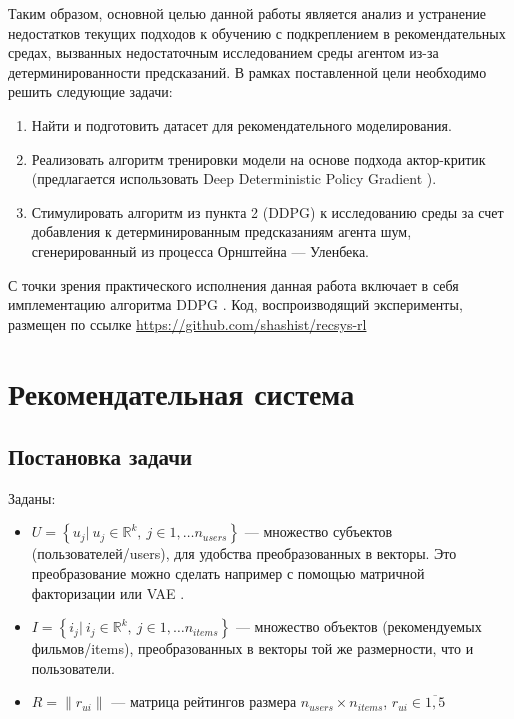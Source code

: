 \documentclass[14pt]{extarticle}
\begin{document}
Таким образом, основной целью данной работы является анализ и устранение недостатков текущих подходов к обучению с подкреплением в рекомендательных средах, вызванных недостаточным исследованием среды агентом из-за детерминированности предсказаний. В рамках поставленной цели необходимо решить следующие задачи:
\begin{enumerate}
\item Найти и подготовить датасет для рекомендательного моделирования.
\item Реализовать алгоритм тренировки модели на основе подхода актор-критик (предлагается использовать Deep Deterministic Policy Gradient \cite{ddpg}).
\item Стимулировать алгоритм из пункта 2 (DDPG) к исследованию среды за счет добавления к детерминированным предсказаниям агента шум, сгенерированный из процесса Орнштейна --- Уленбека.
\end{enumerate}
С точки зрения практического исполнения данная работа включает в себя имплементацию алгоритма DDPG \cite{ddpg}. Код, воспроизводящий эксперименты, размещен по ссылке \href{https://github.com/shashist/recsys-rl/}{https://github.com/shashist/recsys-rl}

\newpage

\section{Рекомендательная система}

\subsection{Постановка задачи}

Заданы:
\begin{itemize}

    \item $U = \left\{ u_j|\ u_j \in \mathbb{R}^k,\ j \in 1,\dots n_{users} \right\}$ --- множество субъектов (пользователей/users), для удобства преобразованных в векторы. Это преобразование можно сделать например с помощью матричной факторизации или VAE \cite{vae}.
    \item $I = \left\{ i_j|\ i_j \in \mathbb{R}^k,\ j \in 1,\dots n_{items} \right\}$ --- множество объектов (рекомендуемых фильмов/items), преобразованных в векторы той же размерности, что и пользователи.
    \item $R = \| r_{ui}\|$ --- матрица рейтингов размера $n_{users}\times n_{items}$, $r_{ui}\in \overline{1, 5}$

\end{itemize}
\end{document}
